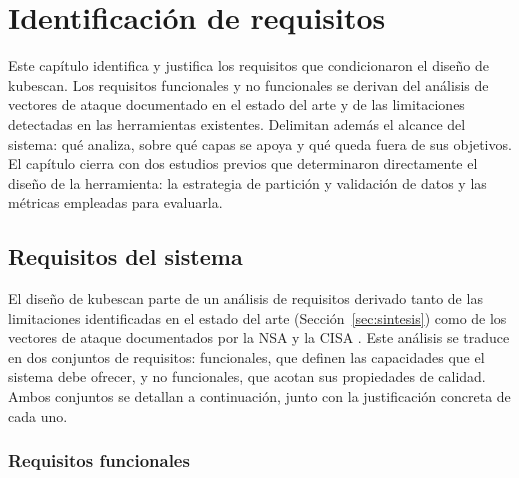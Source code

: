 \chapter{Identificación de requisitos}
\label{cap:requisitos}

Este capítulo identifica y justifica los requisitos que condicionaron el diseño
de kubescan. Los requisitos funcionales y no funcionales se derivan del
análisis de vectores de ataque documentado en el estado del arte y de las
limitaciones detectadas en las herramientas existentes. Delimitan además el
alcance del sistema: qué analiza, sobre qué capas se apoya y qué queda fuera de
sus objetivos. El capítulo cierra con dos estudios previos que determinaron
directamente el diseño de la herramienta: la estrategia de partición y
validación de datos y las métricas empleadas para evaluarla.

\section{Requisitos del sistema}
\label{sec:requisitos}

El diseño de kubescan parte de un análisis de requisitos derivado tanto de
las limitaciones identificadas en el estado del arte (Sección~\ref{sec:sintesis}) como
de los vectores de ataque documentados por la \ac{NSA} y la \ac{CISA} \citep{NSA2022}.
Este análisis se traduce en dos conjuntos de requisitos: funcionales, que definen
las capacidades que el sistema debe ofrecer, y no funcionales, que acotan sus
propiedades de calidad. Ambos conjuntos se detallan a continuación, junto con la
justificación concreta de cada uno.

\subsection{Requisitos funcionales}


